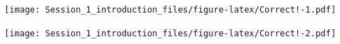 \documentclass[]{article}
\newenvironment{Shaded}{\begin{snugshade}}{\end{snugshade}}
\newcommand{\AttributeTok}[1]{\textcolor[rgb]{0.77,0.63,0.00}{#1}}
\newcommand{\FunctionTok}[1]{\textcolor[rgb]{0.00,0.00,0.00}{#1}}
\newcommand{\NormalTok}[1]{#1}
\newcommand{\SpecialCharTok}[1]{\textcolor[rgb]{0.00,0.00,0.00}{#1}}
\newcommand{\StringTok}[1]{\textcolor[rgb]{0.31,0.60,0.02}{#1}}
\begin{document}
\texttt{[image: Session\_1\_introduction\_files/figure-latex/Correct!-1.pdf]}

\begin{Shaded}
\end{Shaded}

\texttt{[image: Session\_1\_introduction\_files/figure-latex/Correct!-2.pdf]}
\end{document}
